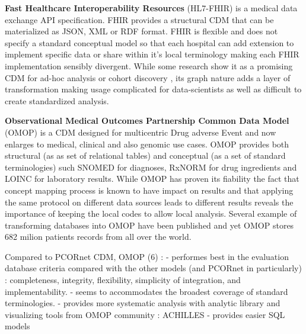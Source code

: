 \documentclass{aes2e}
\begin{document}
\textbf{Fast Healthcare Interoperability Resources} (HL7-FHIR) is a medical data exchange API specification. FHIR provides a structural CDM that can be materialized as JSON, XML or RDF format. FHIR is flexible and does not specify a standard conceptual model so that each hospital can add extension to implement specific data or share within it's local terminology making each FHIR implementation sensibly divergent. While some research show it as a promising CDM for ad-hoc analysis \cite{fhir-google} or cohort discovery \cite{fhir-paris}, its graph nature adds a layer of transformation making usage complicated for data-scientists as well as difficult to create standardized analysis. 


\textbf{Observational Medical Outcomes Partnership Common Data Model} (OMOP) is a
CDM designed for multicentric Drug adverse Event and now enlarges to medical,
clinical and also genomic use cases. OMOP provides both structural (as as set
of relational tables) and conceptual (as a set of standard terminologies) such
SNOMED for diagnoses, RxNORM for drug ingredients and LOINC for laboratory
results.  While OMOP has proven its fiability \cite{omop-eval} the fact that
concept mapping process is known to have impact on results \cite{omop-concept-impact} and that
applying the same protocol on different data sources leads to different results
\cite{omop-replicability} reveals the importance of keeping the local codes to allow local
analysis. Several example of transforming databases into OMOP have been
published \cite{omop-german,omop-nashville} and yet OMOP stores 682 milion
patients records from all over the world\cite{omop-bigboy}.

Compared to PCORnet CDM, OMOP (6) :
- performes best in the evaluation database criteria compared with the other
  models (and PCORnet in particularly) : completeness, integrity, flexibility,
  simplicity of integration, and implementability.
- seems to accommodates the broadest coverage of standard terminologies.
- provides more systematic analysis with analytic library and visualizing tools
  from OMOP community : ACHILLES
- provides easier SQL models 
  
\end{document}
